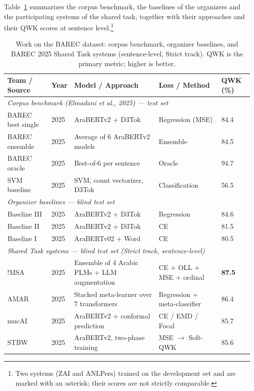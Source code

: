 Table~\ref{tab:barec_systems} summarizes the corpus benchmark, the baselines of the organizers and the participating systems of the shared task, together with their approaches and their QWK scores at sentence level.\footnote{Two systems (ZAI and ANLPers) trained on the development set and are marked with an asterisk; their scores are not strictly comparable.}

\begin{table}[H]
\centering
\footnotesize
\caption{Work on the BAREC dataset: corpus benchmark, organizer baselines, and BAREC 2025 Shared Task systems (sentence-level, Strict track). QWK is the primary metric; higher is better.}
\label{tab:barec_systems}
\begin{tabular}{p{2.4cm} p{0.8cm} p{4.8cm} p{2.2cm} p{1.2cm}}
\toprule
\textbf{Team / Source} & \textbf{Year} & \textbf{Model / Approach} & \textbf{Loss / Method} & \textbf{QWK (\%)} \\
\midrule
\multicolumn{5}{l}{\textit{Corpus benchmark (Elmadani et al., 2025) --- test set}} \\
\midrule
BAREC best single & 2025 & AraBERTv2 + D3Tok & Regression (MSE) & 84.4 \\
BAREC ensemble & 2025 & Average of 6 AraBERTv2 models & Ensemble & 84.5 \\
BAREC oracle & 2025 & Best-of-6 per sentence & Oracle & 94.7 \\
SVM baseline & 2025 & SVM, count vectorizer, D3Tok & Classification & 56.5 \\
\midrule
\multicolumn{5}{l}{\textit{Organizer baselines --- blind test set}} \\
\midrule
Baseline III & 2025 & AraBERTv2 + D3Tok & Regression & 84.6 \\
Baseline II & 2025 & AraBERTv2 + D3Tok & CE & 81.5 \\
Baseline I & 2025 & AraBERTv02 + Word & CE & 80.5 \\
\midrule
\multicolumn{5}{l}{\textit{Shared Task systems --- blind test set (Strict track, sentence-level)}} \\
\midrule
!MSA & 2025 & Ensemble of 4 Arabic PLMs + LLM augmentation & CE + OLL + MSE + ordinal & \textbf{87.5} \\
AMAR & 2025 & Stacked meta-learner over 7 transformers & Regression + meta-classifier & 86.4 \\
mucAI & 2025 & AraBERTv2 + conformal prediction & CE / EMD / Focal & 85.7 \\
STBW & 2025 & AraBERTv2, two-phase training & MSE $\rightarrow$ Soft-QWK & 85.6 \\

\end{tabular}
\end{table}
